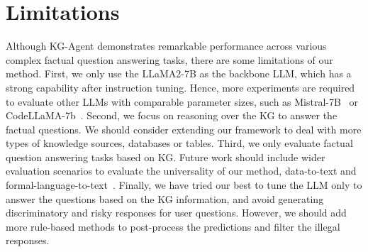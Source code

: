 \section*{Limitations} \label{limitations}
Although KG-Agent demonstrates remarkable performance across various complex factual question answering tasks, there are some limitations of our method.
First, we only use the LLaMA2-7B as the backbone LLM, which has a strong capability after instruction tuning. Hence, more experiments are required to evaluate other LLMs with comparable parameter sizes, such as Mistral-7B~\cite{Mistral} or CodeLLaMA-7b~\cite{CodeLLaMA}.
Second, we focus on reasoning over the KG to answer the factual questions. We should consider extending our framework to deal with more types of knowledge sources, \eg databases or tables.
Third, we only evaluate factual question answering tasks based on KG. Future work should include wider evaluation scenarios to evaluate the universality of our method, \eg data-to-text and formal-language-to-text~\cite{xie-EMNLP-22}. 
Finally, we have tried our best to tune the LLM only to answer the questions based on the KG information, and avoid generating discriminatory and risky responses for user questions. However, we should add more rule-based methods to post-process the predictions and filter the illegal responses.